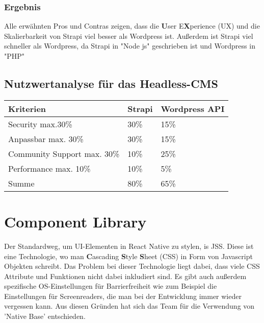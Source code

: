 \begin{spacing}{1}
    \subsubsection{Ergebnis}
    Alle erwähnten Pros und Contras zeigen, dass  die \textbf{U}ser E\textbf{X}perience (UX)
    und die Skalierbarkeit von Strapi viel besser als Wordpress ist.
    Außerdem ist Strapi viel schneller als Wordpress,
    da Strapi in "Node js" geschrieben ist und Wordpress in "PHP"
    \cite{strapi-vs-wordpress}

    \subsection{Nutzwertanalyse für das Headless-CMS}

    \begin{tabular}{ |p{3cm}|p{3cm}|p{3cm}| }
        \hline
        Kriterien                   & Strapi & Wordpress API \\
        \hline
        Security max.30\%           & 30\%   & 15\%          \\
        \hline
        Anpassbar max. 30\%         & 30\%   & 15\%          \\
        \hline
        Community Support max. 30\% & 10\%   & 25\%          \\
        \hline
        Performance max. 10\%       & 10\%   & 5\%           \\
        \hline
        Summe                       & 80\%   & 65\%          \\
        \hline
    \end{tabular}


\end{spacing}

\section{Component Library}
Der Standardweg, um UI-Elementen in React Native zu stylen, is JSS. Diese ist eine Technologie, wo man \textbf{C}ascading \textbf{S}tyle \textbf{S}heet (CSS)
in Form von Javascript Objekten schreibt. Das Problem bei dieser Technologie liegt dabei,
dass viele CSS Attribute und Funktionen nicht dabei inkludiert sind. Es gibt auch außerdem spezifische OS-Einstellungen für Barrierfreiheit wie zum Beispiel die Einstellungen für Screenreaders,
die man bei der Entwicklung immer wieder vergessen kann.
Aus diesen Gründen hat sich das Team für die Verwendung von 'Native Base' entschieden.

